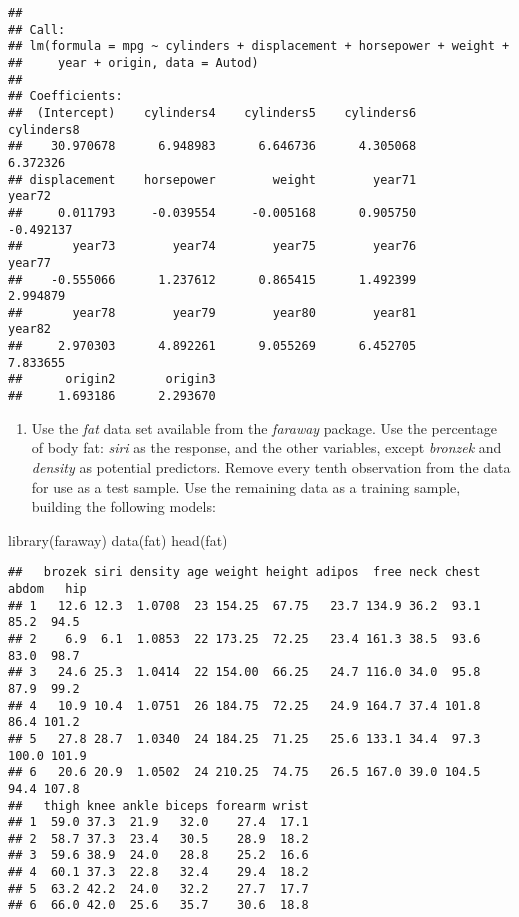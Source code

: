 \documentclass[
]{article}
\newenvironment{Shaded}{\begin{snugshade}}{\end{snugshade}}
\newcommand{\FunctionTok}[1]{\textcolor[rgb]{0.00,0.00,0.00}{#1}}
\newcommand{\NormalTok}[1]{#1}
\providecommand{\tightlist}{%
  \setlength{\itemsep}{0pt}\setlength{\parskip}{0pt}}
\begin{document}
\begin{verbatim}
## 
## Call:
## lm(formula = mpg ~ cylinders + displacement + horsepower + weight + 
##     year + origin, data = Autod)
## 
## Coefficients:
##  (Intercept)    cylinders4    cylinders5    cylinders6    cylinders8  
##    30.970678      6.948983      6.646736      4.305068      6.372326  
## displacement    horsepower        weight        year71        year72  
##     0.011793     -0.039554     -0.005168      0.905750     -0.492137  
##       year73        year74        year75        year76        year77  
##    -0.555066      1.237612      0.865415      1.492399      2.994879  
##       year78        year79        year80        year81        year82  
##     2.970303      4.892261      9.055269      6.452705      7.833655  
##      origin2       origin3  
##     1.693186      2.293670
\end{verbatim}

\begin{enumerate}
\def\labelenumi{\arabic{enumi}.}
\setcounter{enumi}{1}
\tightlist
\item
  Use the \emph{fat} data set available from the \emph{faraway} package.
  Use the percentage of body fat: \emph{siri} as the response, and the
  other variables, except \emph{bronzek} and \emph{density} as potential
  predictors. Remove every tenth observation from the data for use as a
  test sample. Use the remaining data as a training sample, building the
  following models:
\end{enumerate}

\begin{Shaded}
\begin{Highlighting}[]
\FunctionTok{library}\NormalTok{(faraway)}
\FunctionTok{data}\NormalTok{(fat)}
\FunctionTok{head}\NormalTok{(fat)}
\end{Highlighting}
\end{Shaded}

\begin{verbatim}
##   brozek siri density age weight height adipos  free neck chest abdom   hip
## 1   12.6 12.3  1.0708  23 154.25  67.75   23.7 134.9 36.2  93.1  85.2  94.5
## 2    6.9  6.1  1.0853  22 173.25  72.25   23.4 161.3 38.5  93.6  83.0  98.7
## 3   24.6 25.3  1.0414  22 154.00  66.25   24.7 116.0 34.0  95.8  87.9  99.2
## 4   10.9 10.4  1.0751  26 184.75  72.25   24.9 164.7 37.4 101.8  86.4 101.2
## 5   27.8 28.7  1.0340  24 184.25  71.25   25.6 133.1 34.4  97.3 100.0 101.9
## 6   20.6 20.9  1.0502  24 210.25  74.75   26.5 167.0 39.0 104.5  94.4 107.8
##   thigh knee ankle biceps forearm wrist
## 1  59.0 37.3  21.9   32.0    27.4  17.1
## 2  58.7 37.3  23.4   30.5    28.9  18.2
## 3  59.6 38.9  24.0   28.8    25.2  16.6
## 4  60.1 37.3  22.8   32.4    29.4  18.2
## 5  63.2 42.2  24.0   32.2    27.7  17.7
## 6  66.0 42.0  25.6   35.7    30.6  18.8
\end{verbatim}
\end{document}
